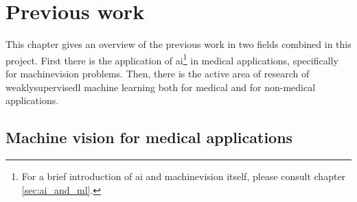 \chapter{Previous work}
\par{
    This chapter gives an overview of the previous work in two fields combined in this project.
    First there is the application of \Gls{ai}\footnote{For a brief introduction of \Gls{ai} and \Gls{machinevision} itself, please consult chapter \ref{sec:ai_and_ml}.} 
    in medical applications, specifically for \Gls{machinevision} problems.
    Then, there is the active area of research of \Gls{weaklysupervisedl} machine learning both for medical and for non-medical applications.
}





\section{Machine vision for medical applications\label{sec:MachineVisionMedical}}

